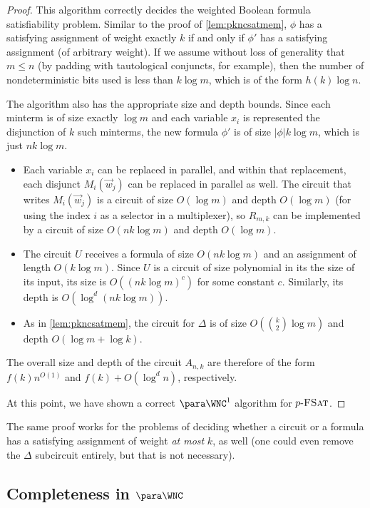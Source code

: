 \begin{proof}
  This algorithm correctly decides the weighted Boolean formula satisfiability problem.
  Similar to the proof of \autoref{lem:pkncsatmem}, $\phi$ has a satisfying assignment of weight exactly $k$ if and only if $\phi'$ has a satisfying assignment (of arbitrary weight).
  If we assume without loss of generality that $m \leq n$ (by padding with tautological conjuncts, for example), then the number of nondeterministic bits used is less than $k \log m$, which is of the form $h(k) \log n$.

  The algorithm also has the appropriate size and depth bounds.
  Since each minterm is of size exactly $\log m$ and each variable $x_i$ is represented the disjunction of $k$ such minterms, the new formula $\phi'$ is of size $|\phi| k \log m$, which is just $n k \log m$.
  \begin{itemize}
  \item
    Each variable $x_i$ can be replaced in parallel, and within that replacement, each disjunct $M_i(\vec{w}_j)$ can be replaced in parallel as well.
    The circuit that writes $M_i(\vec{w}_j)$ is a circuit of size $O(\log m)$ and depth $O(\log m)$ (for using the index $i$ as a selector in a multiplexer), so $R_{m, k}$ can be implemented by a circuit of size $O(n k \log m)$ and depth $O(\log m)$.
  \item
    The circuit $U$ receives a formula of size $O(n k \log m)$ and an assignment of length $O(k \log m)$.
    Since $U$ is a circuit of size polynomial in its the size of its input, its size is $O((n k \log m)^c)$ for some constant $c$.
    Similarly, its depth is $O(\log^d (n k \log m))$.
  \item As in \autoref{lem:pkncsatmem}, the circuit for $\Delta$ is of size $O(\binom{k}{2} \log m)$ and depth $O(\log m + \log k)$.
  \end{itemize}
  The overall size and depth of the circuit $A_{n, k}$ are therefore of the form $f(k) n^{O(1)}$ and $f(k) + O(\log^d n)$, respectively.

  At this point, we have shown a correct $\para \WNC^1$ algorithm for $p \textnormal{-} \textsc{FSat}$.
\end{proof}

The same proof works for the problems of deciding whether a circuit or a formula has a satisfying assignment of weight \emph{at most} $k$, as well (one could even remove the $\Delta$ subcircuit entirely, but that is not necessary).

\subsection{Completeness in \texorpdfstring{$\para \WNC$}{paraWNC}}
\label{sec:parawnccompleteness}

